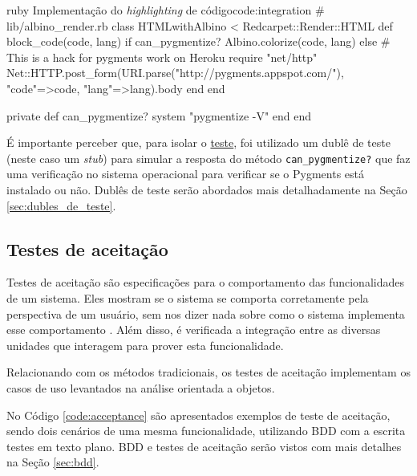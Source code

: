 \begin{mycode}{ruby}%
{Implementação do \textit{highlighting} de código}{code:integration}
# lib/albino_render.rb
class HTMLwithAlbino < Redcarpet::Render::HTML
  def block_code(code, lang)
    if can_pygmentize?
      Albino.colorize(code, lang)
    else
      # This is a hack for pygments work on Heroku
      require "net/http"
      Net::HTTP.post_form(URI.parse("http://pygments.appspot.com/"),
                          {"code"=>code, "lang"=>lang}).body
    end
  end

  private
  def can_pygmentize?
    system "pygmentize -V"
  end
end
\end{mycode}

É importante perceber que, para isolar o \hyperref[code:integration_spec]{teste}, foi utilizado um dublê de teste (neste caso um \textit{stub}) para simular a resposta do método \texttt{can\_pygmentize?} que faz uma verificação no sistema operacional para verificar se o Pygments está instalado ou não. Dublês de teste serão abordados mais detalhadamente na Seção \ref{sec:dubles_de_teste}.


\subsection{Testes de aceitação}
\label{ssub:testes_de_aceitacao}

Testes de aceitação são especificações para o comportamento das funcionalidades de um sistema. Eles mostram se o sistema se comporta corretamente pela perspectiva de um usuário, sem nos dizer nada sobre como o sistema implementa esse comportamento \cite{TestDrivenKoskela}. Além disso, é verificada a integração entre as diversas unidades que interagem para prover esta funcionalidade.

Relacionando com os métodos tradicionais, os testes de aceitação implementam os casos de uso levantados na análise orientada a objetos.

No Código \ref{code:acceptance} são apresentados exemplos de teste de aceitação, sendo dois cenários de uma mesma funcionalidade, utilizando BDD com a escrita testes em texto plano. BDD e testes de aceitação serão vistos com mais detalhes na Seção \ref{sec:bdd}.

